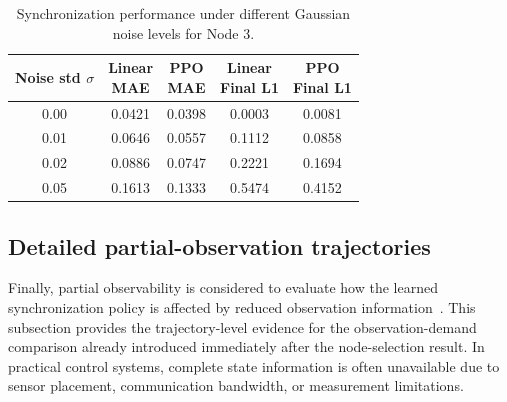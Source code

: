 \documentclass[10pt,twocolumn]{article}
\newcommand{\rev}[1]{{\color{revisionblue}#1}}
\theoremstyle{definition}
\begin{document}
\begin{table}[htbp]
	\centering
	\setlength{\tabcolsep}{2pt}
	\renewcommand{\arraystretch}{1.12}
	\caption{Synchronization performance under different Gaussian noise levels for Node 3.}
	\label{tab:gaussian_noise}
	\begin{tabular}{@{}ccccc@{}}
		\toprule
		\makecell{Noise std\\$\sigma$} & \makecell{Linear\\MAE} & \makecell{PPO\\MAE} & \makecell{Linear\\Final L1} & \makecell{PPO\\Final L1} \\
		\midrule
		0.00 & 0.0421 & 0.0398 & 0.0003 & 0.0081 \\
		0.01 & 0.0646 & 0.0557 & 0.1112 & 0.0858 \\
		0.02 & 0.0886 & 0.0747 & 0.2221 & 0.1694 \\
		0.05 & 0.1613 & 0.1333 & 0.5474 & 0.4152 \\
		\bottomrule
	\end{tabular}
\end{table}

\subsection{Detailed partial-observation trajectories}
Finally, partial observability is considered to evaluate how the learned synchronization policy is affected by reduced observation information~\cite{weissenbacher2025reinforcement}. \rev{This subsection provides the trajectory-level evidence for the observation-demand comparison already introduced immediately after the node-selection result.} In practical control systems, complete state information is often unavailable due to sensor placement, communication bandwidth, or measurement limitations.
\end{document}
